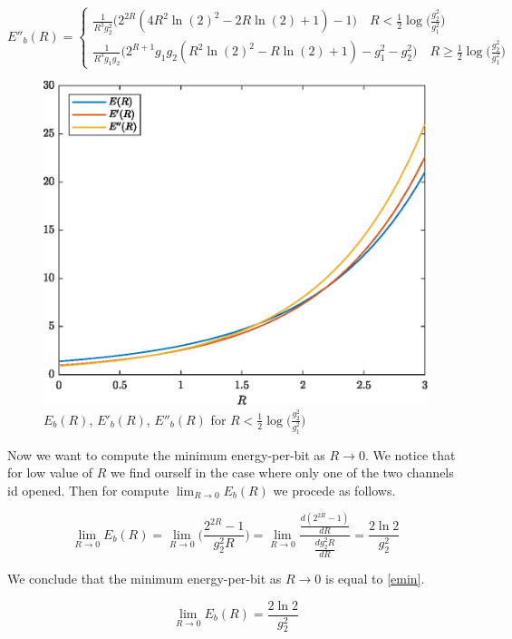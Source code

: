 \begin{equation}
	E''_b(R)= \begin{cases}
		\frac{1}{R^3g_2^2} \Big(2^{2R}(4R^2\ln(2)^2 -2R \ln(2)+1)-1\Big)  \quad R < \frac{1}{2} \log\Big(\frac{g_2^2}{g_1^2}\Big) \\
		\frac{1}{R^3 g_1 g_2} \Big( 2^{R+1} g_1 g_2 ( R^2 \ln(2)^2 - R \ln(2) +1 ) -g_1^2 -g_2^2 \Big) \quad R \geq \frac{1}{2} \log\Big(\frac{g_2^2}{g_1^2}\Big)

\end{cases}
\end{equation}

\begin{figure}[h!]
	\centering
	\includegraphics[width=0.7\linewidth]{img/energy_per_bit_1.eps}
	\caption{$E_b(R)$, $E'_b(R)$, $E''_b(R)$ for $R < \frac{1}{2} \log\Big(\frac{g_2^2}{g_1^2}\Big)$ }
	\label{fig:funcex2}
\end{figure}


Now we want to compute the minimum energy-per-bit as $R \rightarrow 0$. We notice that for low value of $R$ we find ourself in the case where only one of the two channels id opened. Then for compute $\lim_{R \rightarrow 0} E_b(R)$ we procede as follows.

\begin{equation}
	\lim_{R \rightarrow 0} E_b(R) =
		\lim_{R \rightarrow 0} \Big(\frac{2^{2R}-1}{g_2^2 R}\Big) = \lim_{R \rightarrow 0} \frac{ \frac{d(2^{2R}-1)}{dR}} {\frac{dg_2^2 R}{dR}}=\frac{2\ln{2}}{g_2^2}
\end{equation}

We conclude that the minimum energy-per-bit as $R \rightarrow 0$ is equal to \eqref{emin}.

\begin{equation}
	\lim_{R \rightarrow 0} E_b(R) =
		\frac{2\ln{2}}{g_2^2}
\label{emin}
\end{equation}

